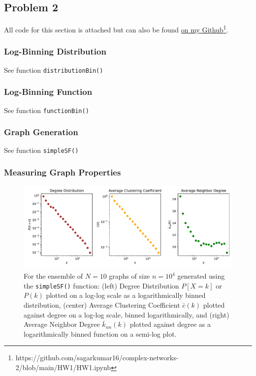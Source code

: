 \documentclass{neu-assignment}
\begin{document}
\subsection*{Problem 2}

All code for this section is attached but can also be found \href{https://github.com/sagarkumar16/complex-networks-2/blob/main/HW1/HW1.ipynb}{on my Github}\footnote{https://github.com/sagarkumar16/complex-networks-2/blob/main/HW1/HW1.ipynb}.

\subsubsection*{Log-Binning Distribution} See function \texttt{distributionBin()}
\subsubsection*{Log-Binning Function} See function \texttt{functionBin()}
\subsubsection*{Graph Generation} See function \texttt{simpleSF()}
\subsubsection*{Measuring Graph Properties}

\begin{figure}[h!]
    \centering
    \includegraphics[scale=0.5]{figures/HW1_fig1_pk_ck_knnk.pdf}
    \caption{For the ensemble of $N=10$ graphs of size $n=10^4$ generated using the \texttt{simpleSF()} function: (left) Degree Distribution $P[X=k]$ or $P(k)$ plotted on a log-log scale as a logarithmically binned distribution, (center) Average Clustering Coefficient $\bar{c}(k)$ plotted against degree on a log-log scale, binned logarithmically, and (right) Average Neighbor Degree $\bar{k}_{nn}(k)$ plotted against degree as a logarithmically binned function on a semi-log plot.}
    \label{fig:deg_clu_knnk}
\end{figure}
\end{document}
